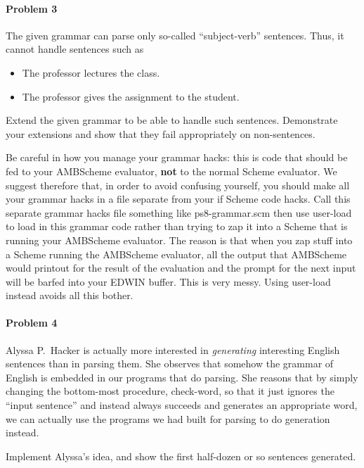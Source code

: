 \paragraph{Problem 3}

The given grammar can parse only so-called ``subject-verb'' sentences.  Thus,
it cannot handle sentences such as
%
\begin{itemize}
  \item The professor lectures the class.
  \item The professor gives the assignment to the student.
\end{itemize}
%
Extend the given grammar to be able to handle such sentences.  Demonstrate your
extensions and show that they fail appropriately on non-sentences.

Be careful in how you manage your grammar hacks: this is code that should be
fed to your {\sc AMBScheme} evaluator, {\bf not} to the normal {\sc Scheme}
evaluator.  We suggest therefore that, in order to avoid confusing yourself,
you should make all your grammar hacks in a file separate from your {\cf if}
{\sc Scheme} code hacks.  Call this separate grammar hacks file something like
{\cf ps8-grammar.scm} then use {\cf user-load} to load in this grammar code
rather than trying to zap it into a {\sc Scheme} that is running your {\sc
AMBScheme} evaluator.  The reason is that when you zap stuff into a {\sc
Scheme} running the {\sc AMBScheme} evaluator, all the output that {\sc
AMBScheme} would printout for the result of the evaluation and the prompt for
the next input will be barfed into your {\sc EDWIN} buffer.  This is very
messy.  Using {\cf user-load} instead avoids all this bother.

\paragraph{Problem 4}

Alyssa P.~Hacker is actually more interested in {\sl generating} interesting
English sentences than in parsing them.  She observes that somehow the grammar
of English is embedded in our programs that do parsing.  She reasons that by
simply changing the bottom-most procedure, {\cf check-word}, so that it just
ignores the ``input sentence'' and instead always succeeds and generates an
appropriate word, we can actually use the programs we had built for parsing to
do generation instead.

Implement Alyssa's idea, and show the first half-dozen or so sentences generated.

